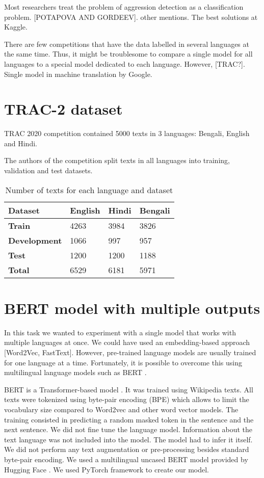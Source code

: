 \documentclass[10pt, a4paper]{article}
\begin{document}
Most researchers treat the problem of aggression detection as a classification problem. [POTAPOVA AND GORDEEV]. other mentions. The best solutions at Kaggle.

There are few competitions that have the data labelled in several languages at the same time. Thus, it might be troublesome to compare a single model for all languages to a special model dedicated to each language. However, [TRAC?]. Single model in machine translation by Google.
\section{TRAC-2 dataset}
TRAC 2020 competition contained 5000 texts in 3 languages: Bengali, English and Hindi.

The authors of the competition split texts in all languages into training, validation and test datasets.
\begin{table}[h]
	\begin{tabular}{|l|lll|}
		\hline
		\bf Dataset & \bf English & \bf Hindi & \bf Bengali\\ 
		\hline
		\hline
\bf Train & 	  4263 & 3984 & 3826\\  \hline
\bf Development & 1066 & 997  & 957\\  \hline
\bf Test & 		  1200 & 1200 & 1188\\ \hline\hline
\bf Total &       6529 & 6181 & 5971\\ \hline
	\end{tabular}
	\caption{Number of texts for each language and dataset}
	\label{tab:dataset}
\end{table}

\section{BERT model with multiple outputs}
In this task we wanted to experiment with a single model that works with multiple languages at once. We could have used an embedding-based approach [Word2Vec, FastText]. However, pre-trained language models are usually trained for one language at a time.  Fortunately, it is possible to overcome this using multilingual language models such as BERT \cite{bert}.

BERT is a Transformer-based model \cite{attention}. It was trained using Wikipedia texts. All texts were tokenized using byte-pair encoding (BPE) which allows to limit the vocabulary size compared to Word2vec and other word vector models. The training consisted in predicting a random masked token in the sentence and the next sentence. We did not fine tune the language model. Information about the text language was not included into the model. The model had to infer it itself. We did not perform any text augmentation or pre-processing besides standard byte-pair encoding.
We used a multilingual uncased BERT model provided by Hugging Face \cite{Wolf2019HuggingFacesTS}. We used PyTorch framework to create our model.
\end{document}
